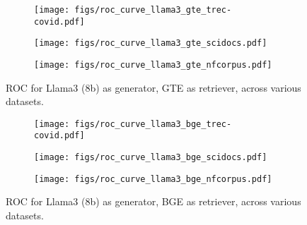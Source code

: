 











\begin{figure*}[t]
    \centering
    \begin{subfigure}[t]{0.32\textwidth}
        \centering
        \texttt{[image: figs/roc\_curve\_llama3\_gte\_trec-covid.pdf]}
    \end{subfigure}
    \begin{subfigure}[t]{0.32\textwidth}
        \centering
        \texttt{[image: figs/roc\_curve\_llama3\_gte\_scidocs.pdf]}
        \label{fig:llama3_scidocs_gte}
    \end{subfigure}
    \begin{subfigure}[t]{0.32\textwidth}
        \centering
        \texttt{[image: figs/roc\_curve\_llama3\_gte\_nfcorpus.pdf]}
    \end{subfigure}
    
    \caption{ROC for Llama3 (8b) as generator, GTE as retriever, across various datasets.}
    \label{fig:rocs_llama3_gte}
\end{figure*}

\begin{figure*}[t]
    \centering
    \begin{subfigure}[t]{0.32\textwidth}
        \centering
        \texttt{[image: figs/roc\_curve\_llama3\_bge\_trec-covid.pdf]}
    \end{subfigure}
    \begin{subfigure}[t]{0.32\textwidth}
        \centering
        \texttt{[image: figs/roc\_curve\_llama3\_bge\_scidocs.pdf]}
        \label{fig:llama3_scidocs_bge}
    \end{subfigure}
    \begin{subfigure}[t]{0.32\textwidth}
        \centering
        \texttt{[image: figs/roc\_curve\_llama3\_bge\_nfcorpus.pdf]}
    \end{subfigure}
    
    \caption{ROC for Llama3 (8b) as generator, BGE as retriever, across various datasets.}
    \label{fig:rocs_llama3_bge}
\end{figure*}

